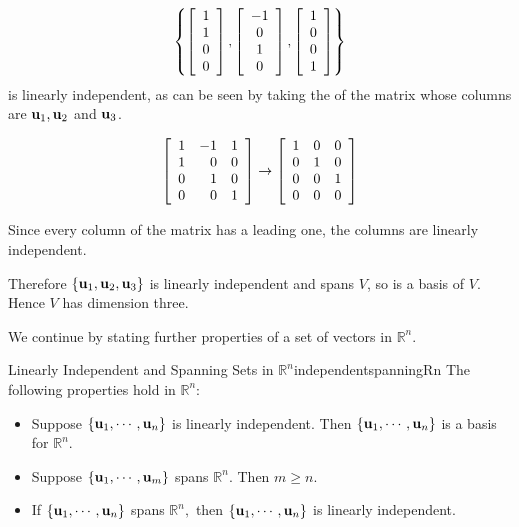 \begin{solution}
\[\left\{ 
\left[\begin{array}{c} 1\\ 1\\ 0\\ 0\end{array}\right],
\left[\begin{array}{c} -1\\ 0\\ 1\\ 0\end{array}\right],
\left[\begin{array}{c} 1\\ 0\\ 0\\ 1\end{array}\right] \right\}\]
is linearly independent, as can be seen by taking the
{\rref} of the matrix whose columns are
${\bf u}_1, {\bf u}_2$ and ${\bf u}_3$.

\[ \left[\begin{array}{rrr}
1 & -1 & 1 \\
1 & 0 & 0 \\
0 & 1 & 0 \\
0 & 0 & 1 \end{array}\right]
\rightarrow
\left[\begin{array}{rrr}
1 & 0 & 0 \\
0 & 1 & 0 \\
0 & 0 & 1 \\
0 & 0 & 0 \end{array}\right]
\]

Since every column of the {\rref} matrix has a leading one,
the columns are linearly independent.

Therefore $\{ {\bf u}_1, {\bf u}_2, {\bf u}_3 \}$ is linearly
independent and spans $V$, so is a basis of $V$. Hence 
$V$ has dimension three.
\end{solution}

We continue by stating further properties of a set of vectors in  $\mathbb{R}^{n}$.

\begin{corollary}{Linearly Independent and Spanning Sets in  $\mathbb{R}^{n}$}{independentspanningRn}
The following properties hold in $\mathbb{R}^{n}$:
\begin{itemize}
\item Suppose $\left\{ {\bf u}_{1},\cdots ,{\bf u}_{n}\right\} $ is linearly independent. Then $\left\{ {\bf u}_{1},\cdots ,{\bf u}_{n}\right\} $ is a basis for $\mathbb{R}^{n}$. 
\item Suppose $\left\{ {\bf u}_{1},\cdots ,{\bf u}_{m}\right\} $ spans $\mathbb{R}^{n}.$ Then $m\geq n.$
\item If $\left\{ {\bf u}_{1},\cdots ,{\bf u}_{n}\right\} $ spans $\mathbb{R}^{n},$ then $\left\{ {\bf u}_{1},\cdots ,{\bf u}_{n}\right\} $ is
linearly independent.
\end{itemize}
\end{corollary}


